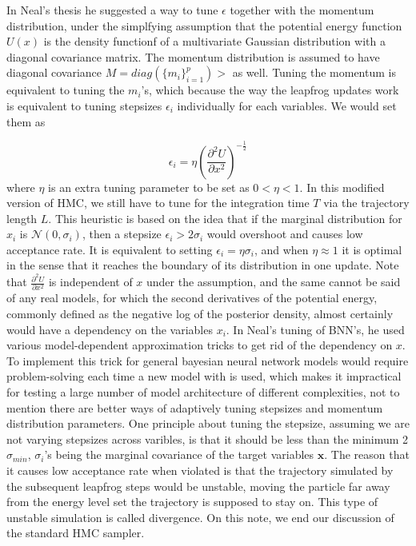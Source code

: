 \documentclass[]{report}
\begin{document}
In Neal's thesis he suggested a way to tune $\epsilon$ together with the
momentum distribution,  under the simplfying assumption that the potential
energy function $U(x)$ is the density functionf of a multivariate Gaussian distribution
with a diagonal
covariance matrix. The momentum distribution is assumed to have diagonal
covariance $M= diag(\{m_i\}_{i=1}^p)>$ as well. Tuning the momentum is
equivalent to tuning the $m_i$'s, which because the way the leapfrog updates
work is equivalent to tuning stepsizes $\epsilon_i$ individually for each
variables. We would set them as

\[ \epsilon_i  = \eta (\frac{\partial^2 U}{\partial x^2})^{-\frac{1}{2}}\]
where $\eta$ is an extra tuning parameter to be set as $0<\eta<1$. In this
modified version of HMC, we still have to tune for the integration time $T$ via
the trajectory length $L$. This heuristic is based on the idea that if the
marginal distribution for $x_i$ is $\mathcal{N}(0,\sigma_i)$, then a
stepsize $\epsilon_i > 2 \sigma_i$ would overshoot and causes low acceptance
rate. It is equivalent to setting $\epsilon_i = \eta \sigma_i$, and when $\eta
\approx 1$ it is optimal in the sense that it reaches the boundary of its
distribution in one update. Note that $  \frac{\partial^2 U}{\partial x^2}$ is
independent of $x$ under the assumption, and the same cannot be said of any real
models, for which the second derivatives of the potential energy, commonly
defined as the negative log of the posterior density, almost certainly would
have a dependency on the variables $x_i$. In Neal's tuning of BNN's, he used
various model-dependent approximation tricks to get rid of the dependency on
$x$. To implement this trick for general bayesian neural network models would require
problem-solving each time a new model with is used, which makes it impractical for
testing a large number of model architecture of different complexities, not to mention there are better ways of adaptively tuning
stepsizes and momentum distribution parameters. One principle about tuning
the stepsize, assuming we are not varying stepsizes across varibles, is that it
should be less than the minimum 2$\sigma_{min}$, $\sigma_i$'s being the marginal
covariance of the target variables $\mathbf{x}$. The reason that it causes low
acceptance rate when violated is that the trajectory simulated by the subsequent
leapfrog steps would be unstable, moving the particle far away from the energy
level set the trajectory is supposed to stay on. This type of unstable
simulation is called divergence. On this note, we end our discussion of the
standard HMC sampler.
\end{document}
